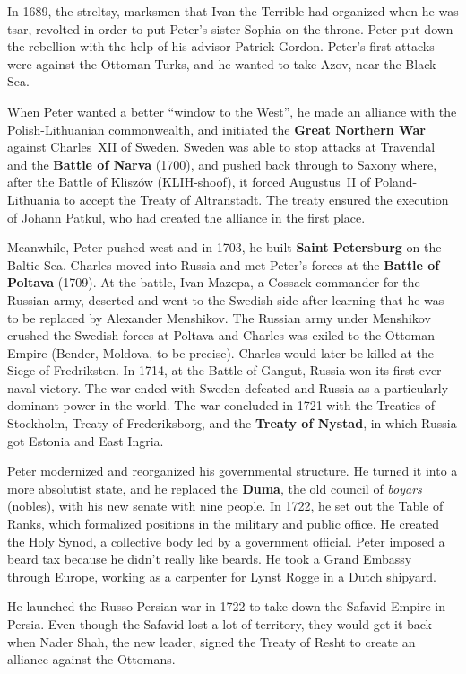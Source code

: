 In 1689, the streltsy, marksmen that Ivan the Terrible had organized when he was tsar,
revolted in order to put Peter's sister Sophia on the throne.
Peter put down the rebellion with the help of his advisor Patrick Gordon.
Peter's first attacks were against the Ottoman Turks, and he wanted to take Azov, near the Black Sea.

When Peter wanted a better ``window to the West'',
he made an alliance with the Polish-Lithuanian commonwealth,
and initiated the \textbf{Great Northern War} against Charles~XII of Sweden.
Sweden was able to stop attacks at Travendal and the \textbf{Battle of Narva} (1700),
and pushed back through to Saxony where, after the Battle of Klisz\'ow (KLIH-shoof),
it forced Augustus~II of Poland-Lithuania to accept the Treaty of Altranstadt.
The treaty ensured the execution of Johann Patkul, who had created the alliance in the first place.

Meanwhile, Peter pushed west and in 1703, he built \textbf{Saint Petersburg} on the Baltic Sea.
Charles moved into Russia and met Peter's forces at the \textbf{Battle of Poltava} (1709).
At the battle, Ivan Mazepa, a Cossack commander for the Russian army,
deserted and went to the Swedish side after learning that he was to be replaced by Alexander Menshikov.
The Russian army under Menshikov crushed the Swedish forces at Poltava
and Charles was exiled to the Ottoman Empire (Bender, Moldova, to be precise).
Charles would later be killed at the Siege of Fredriksten.
In 1714, at the Battle of Gangut, Russia won its first ever naval victory.
The war ended with Sweden defeated and Russia as a particularly dominant power in the world.
The war concluded in 1721 with the Treaties of Stockholm, Treaty of Frederiksborg, and the \textbf{Treaty of Nystad},
in which Russia got Estonia and East Ingria.

Peter modernized and reorganized his governmental structure.
He turned it into a more absolutist state, and he replaced the \textbf{Duma},
the old council of \textit{boyars} (nobles),
with his new senate with nine people.
In 1722, he set out the Table of Ranks, which formalized positions in the military and public office.
He created the Holy Synod, a collective body led by a government official.
Peter imposed a beard tax because he didn't really like beards.
He took a Grand Embassy through Europe, working as a carpenter for Lynst Rogge in a Dutch shipyard.

He launched the Russo-Persian war in 1722 to take down the Safavid Empire in Persia.
Even though the Safavid lost a lot of territory, they would get it back when
Nader Shah, the new leader, signed the Treaty of Resht to create an alliance against the Ottomans.

